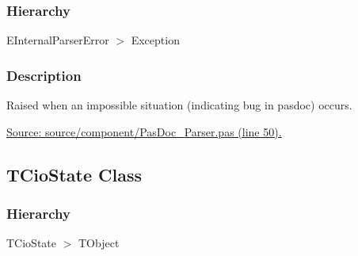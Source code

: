 \documentclass{report}
\newif\ifpdf
\begin{document}
\subsubsection*{\large{\textbf{Hierarchy}}\normalsize\hspace{1ex}\hfill}
EInternalParserError {$>$} Exception
\subsubsection*{\large{\textbf{Description}}\normalsize\hspace{1ex}\hfill}
Raised when an impossible situation (indicating bug in pasdoc) occurs.\par
\href{https://github.com/pasdoc/pasdoc/blob/master/source/component/PasDoc_Parser.pas#L50}{Source: source/component/PasDoc{\_}Parser.pas (line 50).}\ifpdf
\subsection*{\large{\textbf{TCioState Class}}\normalsize\hspace{1ex}\hrulefill}
\else
\subsection*{TCioState Class}
\fi
\label{PasDoc_Parser.TCioState}
\subsubsection*{\large{\textbf{Hierarchy}}\normalsize\hspace{1ex}\hfill}
TCioState {$>$} TObject
\end{document}
